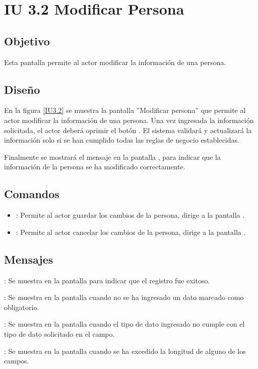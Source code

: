 \section{IU 3.2 Modificar Persona}

\subsection{Objetivo}
	Esta pantalla permite al actor modificar la información de una persona.
\subsection{Diseño}
	En la figura \ref{IU3.2} se muestra la pantalla ''Modificar persona'' que permite al actor modificar la información de una persona.
	Una vez ingresada la información solicitada, el actor deberá oprimir el botón  . El sistema validará y actualizará la información solo si se han cumplido todas las reglas de negocio establecidas.
	
	Finalmente se mostrará el mensaje  en la pantalla , para indicar que la información de la persona se ha modificado correctamente.

\label{IU3.2}
\subsection{Comandos}
\begin{itemize}
	\item {}: Permite al actor guardar los cambios de la persona, dirige a la pantalla .
	\item {}: Permite al actor cancelar los cambios de la persona, dirige a la pantalla .
\end{itemize}

\subsection{Mensajes}

\begin{Citemize}
	\item {}: Se muestra en la pantalla  para indicar que el registro fue exitoso.
	\item {}: Se muestra en la pantalla  cuando no se ha ingresado un dato marcado como obligatorio.
	\item {}: Se muestra en la pantalla  cuando el tipo de dato ingresado no cumple con el tipo de dato solicitado en el campo.
	\item {}: Se muestra en la pantalla  cuando se ha excedido la longitud de alguno de los campos.
\end{Citemize}
